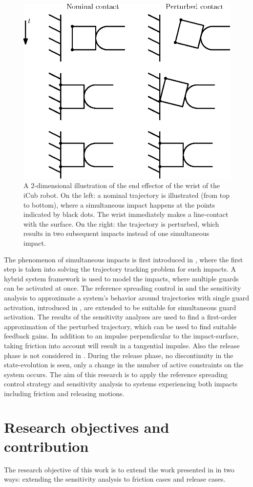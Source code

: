 \documentclass[../DC2017114Bouma.tex]{subfiles}
\begin{document}
\begin{figure}[hbt!]
\centering
\includegraphics[width=.45\textwidth]{simultaneous.eps}\caption{A 2-dimensional illustration of the end effector of the wrist of the iCub robot. On the left: a nominal trajectory is illustrated (from top to bottom), where a simultaneous impact happens at the points indicated by black dots. The wrist immediately makes a line-contact with the surface. On the right: the trajectory is perturbed, which results in two subsequent impacts instead of one simultaneous impact.}\label{fig:simultaneous}
\end{figure}

The phenomenon of simultaneous impacts is first introduced in \cite{Chen2018a}, where the first step is taken into solving the trajectory tracking problem for such impacts. A hybrid system framework is used to model the impacts, where multiple guards can be activated at once. The reference spreading control in \cite{Rijnen2016,Rijnen2017} and the sensitivity analysis to approximate a system's behavior around trajectories with single guard activation, introduced in \cite{Saccon2014}, are extended to be suitable for simultaneous guard activation. The results of the sensitivity analyses are used to find a first-order approximation of the perturbed trajectory, which can be used to find suitable feedback gains. In addition to an impulse perpendicular to the impact-surface, taking friction into account will result in a tangential impulse. Also the release phase is not considered in \cite{Chen2018a}. During the release phase, no discontinuity in the state-evolution is seen, only a change in the number of active constraints on the system occurs. The aim of this research is to apply the reference spreading control strategy and sensitivity analysis to systems experiencing both impacts including friction and releasing motions.

\section{Research objectives and contribution}\label{sec:1resobj}
The research objective of this work is to extend the work presented in \cite{Rijnen2018a} in two ways: extending the sensitivity analysis to friction cases and release cases.
\end{document}
